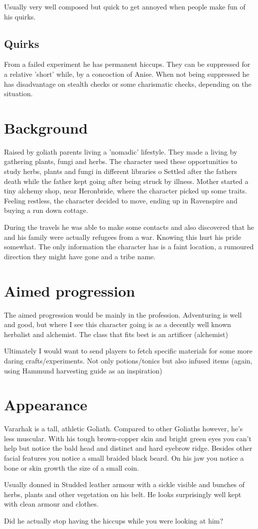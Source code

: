     Usually very well composed but quick to get annoyed when people make fun of his quirks.

    \subsection{Quirks}
    From a failed experiment he has permanent hiccups. They can be suppressed for a relative 'short' while, by a concoction of Anise. When not being suppressed he has disadvantage on stealth checks or some charismatic checks, depending on the situation.

    \section{Background}
    Raised by goliath parents living a 'nomadic' lifestyle. 
    They made a living by gathering plants, fungi and herbs.
    The character used these opportunities to study herbs, plants and fungi in different libraries o 
    Settled after the fathers death while the father kept going after being struck by illness.
    Mother started a tiny alchemy shop, near Heronbride, where the character picked up some traits.
    Feeling restless, the character decided to move, ending up in Ravenspire and buying a run down cottage.

    During the travels he was able to make some contacts and also discovered that he and his family were actually refugees from a war. Knowing this hurt his pride somewhat. The only information the character has is a faint location, a rumoured direction they might have gone and a tribe name.

    \section{Aimed progression}
    The aimed progression would be mainly in the profession. Adventuring is well and good, but where I see this character going is as a decently well known herbalist and alchemist. The class that fits best is an artificer (alchemist)

    Ultimately I would want to send players to fetch specific materials for some more daring crafts/experiments. Not only potions/tonics but also infused items (again, using Hammund harvesting guide as an inspiration)

    \section{Appearance}
    Vararhak is a tall, athletic Goliath. Compared to other Goliaths however, he's less muscular. With his tough brown-copper skin and bright green eyes you can't help but notice the bald head and distinct and hard eyebrow ridge. Besides other facial features you notice a small braided black beard. On his jaw you notice a bone or skin growth the size of a small coin.

    Usually donned in Studded leather armour with a sickle visible and bunches of herbs, plants and other vegetation on his belt. He looks surprisingly well kept with clean armour and clothes.


    Did he actually stop having the hiccups while you were looking at him?
\fi